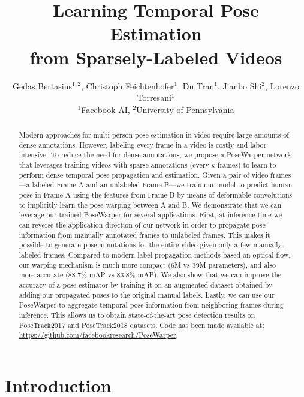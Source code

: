 \documentclass{article}
\title{Learning Temporal Pose Estimation\\from Sparsely-Labeled Videos}
\author{Gedas Bertasius$^{1,2}$, Christoph Feichtenhofer$^{1}$, Du Tran$^{1}$, Jianbo Shi$^{2}$, Lorenzo Torresani$^{1}$\\
$^{1}$Facebook AI, $^{2}$University of Pennsylvania}
\begin{document}
\maketitle

\begin{abstract}

Modern approaches for multi-person pose estimation in video require large amounts of dense annotations. However, labeling every frame in a video is costly and labor intensive. To reduce the need for dense annotations, we propose a PoseWarper network that leverages training videos with sparse annotations (every $k$ frames) to learn to perform dense temporal pose propagation and estimation. Given a pair of video frames---a labeled Frame A and an unlabeled Frame B---we train our model to predict human pose in Frame A using the features from Frame B by means of deformable convolutions to implicitly learn the pose warping between A and B. We demonstrate that we can leverage our trained PoseWarper for several applications. First, at inference time we can reverse the application direction of our network in order to propagate pose information from manually annotated frames to unlabeled frames. This makes it possible to generate pose annotations for the entire video given only a few manually-labeled frames. Compared to modern label propagation methods based on optical flow, our warping mechanism is much more compact ($6$M vs $39$M parameters), and also more accurate ($88.7\%$ mAP vs $83.8\%$ mAP). We also show that we can improve the accuracy of a pose estimator by training it on an augmented dataset obtained by adding our propagated poses to the original manual labels. Lastly, we can use our PoseWarper to aggregate temporal pose information from neighboring frames during inference. This allows us to obtain state-of-the-art pose detection results on PoseTrack2017 and PoseTrack2018 datasets. Code has been made available at: \url{https://github.com/facebookresearch/PoseWarper}.

















\end{abstract}





\section{Introduction}
\end{document}
